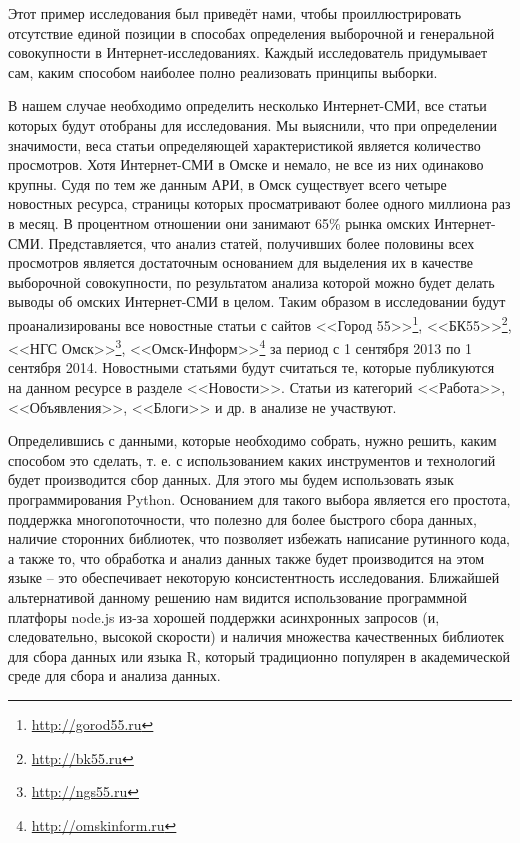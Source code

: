 Этот пример исследования был приведёт нами, чтобы проиллюстрировать отсутствие единой позиции в способах определения выборочной и генеральной совокупности в Интернет-исследованиях. Каждый исследователь придумывает сам, каким способом наиболее полно реализовать принципы выборки.

В нашем случае необходимо определить несколько Интернет-СМИ, все статьи которых будут отобраны для исследования. Мы выяснили, что при определении значимости, веса статьи определяющей характеристикой является количество просмотров. Хотя Интернет-СМИ в Омске и немало, не все из них одинаково крупны. Судя по тем же данным АРИ, в Омск существует всего четыре новостных ресурса, страницы которых просматривают более одного миллиона раз в месяц. В процентном отношении они занимают 65\% рынка омских Интернет-СМИ. Представляется, что анализ статей, получивших более половины всех просмотров является достаточным основанием для выделения их в качестве выборочной совокупности, по результатом анализа которой можно будет делать выводы об омских Интернет-СМИ в целом. Таким образом в исследовании будут проанализированы все новостные статьи с сайтов <<Город 55>>\footnote{\href{http://gorod55.ru}{http://gorod55.ru}}, <<БК55>>\footnote{\href{http://bk55.ru}{http://bk55.ru}}, <<НГС Омск>>\footnote{\href{http://ngs55.ru}{http://ngs55.ru}}, <<Омск-Информ>>\footnote{\href{http://omskinform.ru}{http://omskinform.ru}} за период с 1 сентября 2013 по 1 сентября 2014. Новостными статьями будут считаться те, которые публикуются на данном ресурсе в разделе <<Новости>>. Статьи из категорий <<Работа>>, <<Объявления>>, <<Блоги>> и др. в анализе не участвуют.

Определившись с данными, которые необходимо собрать, нужно решить, каким способом это сделать, т. е. с использованием каких инструментов и технологий будет производится сбор данных. Для этого мы будем использовать язык программирования Python. Основанием для такого выбора является его простота, поддержка многопоточности, что полезно для более быстрого сбора данных, наличие сторонних библиотек, что позволяет избежать написание рутинного кода, а также то, что обработка и анализ данных также будет производится на этом языке -- это обеспечивает некоторую консистентность исследования. Ближайшей альтернативой данному решению нам видится использование программной платфоры node.js из-за хорошей поддержки асинхронных запросов (и, следовательно, высокой скорости) и наличия множества качественных библиотек для сбора данных или языка R, который традиционно популярен в академической среде для сбора и анализа данных.


